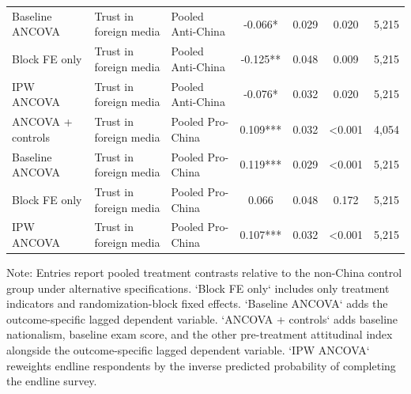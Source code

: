 \begin{table}[H]
\begin{threeparttable}
\begin{tabular}{lllcccc}
Baseline ANCOVA & Trust in foreign media & Pooled Anti-China & -0.066* & 0.029 & 0.020 & 5,215 \\
Block FE only & Trust in foreign media & Pooled Anti-China & -0.125** & 0.048 & 0.009 & 5,215 \\
IPW ANCOVA & Trust in foreign media & Pooled Anti-China & -0.076* & 0.032 & 0.020 & 5,215 \\
ANCOVA + controls & Trust in foreign media & Pooled Pro-China & 0.109*** & 0.032 & <0.001 & 4,054 \\
Baseline ANCOVA & Trust in foreign media & Pooled Pro-China & 0.119*** & 0.029 & <0.001 & 5,215 \\
Block FE only & Trust in foreign media & Pooled Pro-China & 0.066 & 0.048 & 0.172 & 5,215 \\
IPW ANCOVA & Trust in foreign media & Pooled Pro-China & 0.107*** & 0.032 & <0.001 & 5,215 \\
\bottomrule
\end{tabular}
\begin{tablenotes}[flushleft]
\footnotesize
\item Note: Entries report pooled treatment contrasts relative to the non-China control group under alternative specifications. `Block FE only` includes only treatment indicators and randomization-block fixed effects. `Baseline ANCOVA` adds the outcome-specific lagged dependent variable. `ANCOVA + controls` adds baseline nationalism, baseline exam score, and the other pre-treatment attitudinal index alongside the outcome-specific lagged dependent variable. `IPW ANCOVA` reweights endline respondents by the inverse predicted probability of completing the endline survey.
\end{tablenotes}
\end{threeparttable}
\end{table}
